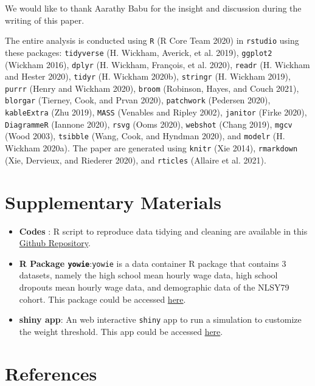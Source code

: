 \documentclass{article}
\begin{document}
We would like to thank Aarathy Babu for the insight and discussion during the writing of this paper.

The entire analysis is conducted using \texttt{R} (R Core Team 2020) in \texttt{rstudio} using these packages: \texttt{tidyverse} (H. Wickham, Averick, et al. 2019), \texttt{ggplot2} (Wickham 2016), \texttt{dplyr} (H. Wickham, François, et al. 2020), \texttt{readr} (H. Wickham and Hester 2020), \texttt{tidyr} (H. Wickham 2020b), \texttt{stringr} (H. Wickham 2019), \texttt{purrr} (Henry and Wickham 2020), \texttt{broom} (Robinson, Hayes, and Couch 2021), \texttt{blorgar} (Tierney, Cook, and Prvan 2020), \texttt{patchwork} (Pedersen 2020), \texttt{kableExtra} (Zhu 2019), \texttt{MASS} (Venables and Ripley 2002), \texttt{janitor} (Firke 2020), \texttt{DiagrammeR} (Iannone 2020), \texttt{rsvg} (Ooms 2020), \texttt{webshot} (Chang 2019), \texttt{mgcv} (Wood 2003), \texttt{tsibble} (Wang, Cook, and Hyndman 2020), and \texttt{modelr} (H. Wickham 2020a). The paper are generated using \texttt{knitr} (Xie 2014), \texttt{rmarkdown} (Xie, Dervieux, and Riederer 2020), and \texttt{rticles} (Allaire et al. 2021).

\hypertarget{supplementary-materials}{%
\section{Supplementary Materials}\label{supplementary-materials}}

\begin{itemize}
\item
  \textbf{Codes} : R script to reproduce data tidying and cleaning are available in this \href{https://github.com/numbats/yowie/blob/master/data-raw/data_preprocessing.R}{Github Repository}.
\item
  \textbf{R Package \texttt{yowie}}:\texttt{yowie} is a data container R package that contains 3 datasets, namely the high school mean hourly wage data, high school dropouts mean hourly wage data, and demographic data of the NLSY79 cohort. This package could be accessed \href{https://github.com/numbats/yowie}{here}.
\item
  \textbf{shiny app}: An web interactive \texttt{shiny} app to run a simulation to customize the weight threshold. This app could be accessed \href{https://github.com/numbats/summer-wages-refresh/tree/main/app}{here}.
\end{itemize}

\hypertarget{references}{%
\section*{References}\label{references}}
\end{document}
